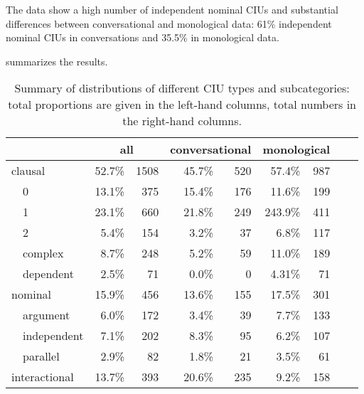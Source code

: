 The data show a high number of independent nominal CIUs and substantial differences between conversational and monological data: 61\% independent nominal CIUs in conversations and 35.5\% in monological data. 

 summarizes the results.

\begin{table}
	\caption{Summary of distributions of different CIU types and subcategories: total proportions are given in the left-hand columns, total numbers in the right-hand columns.}
	\label{Summary IU-types}
	\begin{tabular}{l@{~~}l *8{r}}
		\lsptoprule
		&                        & \multicolumn{2}{c}{all} & \multicolumn{2}{c}{conversational} & \multicolumn{2}{c}{monological} \\\midrule
		\multicolumn{2}{l}{clausal}       & 52.7\%       & 1508      & 45.7\%            & 520            & 57.4\%           & 987          \\
		& 0                      & 13.1\%       & 375      & 15.4\%            & 176             & 11.6\%           & 199          \\
		& 1                      & 23.1\%       & 660      & 21.8\%            & 249             & 243.9\%           & 411          \\
		& 2                      & 5.4\%        & 154       & 3.2\%             & 37              & 6.8\%            & 117           \\
		& complex                & 8.7\%       & 248     & 5.2\%            & 59             & 11.0\%           & 189          \\
		& dependent              & 2.5\%        & 71       & 0.0\%             & 0              & 4.31\%            & 71           \\
		\midrule
		\multicolumn{2}{l}{nominal}       & 15.9\%       & 456      & 13.6\%            & 155             & 17.5\%           & 301          \\
		& argument               & 6.0\%       & 172     & 3.4\%            & 39             & 7.7\%           & 133           \\
		& independent            & 7.1\%       & 202      & 8.3\%            & 95             & 6.2\%           & 107           \\
		& parallel               & 2.9\%       & 82      & 1.8\%             & 21             & 3.5\%           & 61           \\
		\midrule
		\multicolumn{2}{l}{interactional} & 13.7\%       & 393      & 20.6\%            & 235            & 9.2\%            & 158          \\

\end{tabular}
\end{table}
